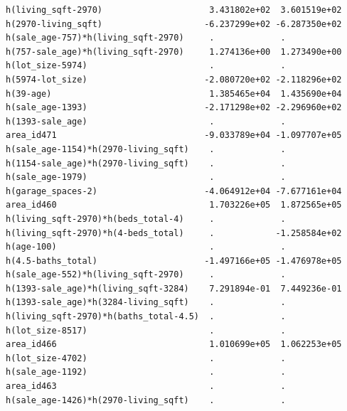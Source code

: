\documentclass[
]{article}
\begin{document}
\begin{verbatim}
h(living_sqft-2970)                     3.431802e+02  3.601519e+02
h(2970-living_sqft)                    -6.237299e+02 -6.287350e+02
h(sale_age-757)*h(living_sqft-2970)     .             .           
h(757-sale_age)*h(living_sqft-2970)     1.274136e+00  1.273490e+00
h(lot_size-5974)                        .             .           
h(5974-lot_size)                       -2.080720e+02 -2.118296e+02
h(39-age)                               1.385465e+04  1.435690e+04
h(sale_age-1393)                       -2.171298e+02 -2.296960e+02
h(1393-sale_age)                        .             .           
area_id471                             -9.033789e+04 -1.097707e+05
h(sale_age-1154)*h(2970-living_sqft)    .             .           
h(1154-sale_age)*h(2970-living_sqft)    .             .           
h(sale_age-1979)                        .             .           
h(garage_spaces-2)                     -4.064912e+04 -7.677161e+04
area_id460                              1.703226e+05  1.872565e+05
h(living_sqft-2970)*h(beds_total-4)     .             .           
h(living_sqft-2970)*h(4-beds_total)     .            -1.258584e+02
h(age-100)                              .             .           
h(4.5-baths_total)                     -1.497166e+05 -1.476978e+05
h(sale_age-552)*h(living_sqft-2970)     .             .           
h(1393-sale_age)*h(living_sqft-3284)    7.291894e-01  7.449236e-01
h(1393-sale_age)*h(3284-living_sqft)    .             .           
h(living_sqft-2970)*h(baths_total-4.5)  .             .           
h(lot_size-8517)                        .             .           
area_id466                              1.010699e+05  1.062253e+05
h(lot_size-4702)                        .             .           
h(sale_age-1192)                        .             .           
area_id463                              .             .           
h(sale_age-1426)*h(2970-living_sqft)    .             .           
                                                                  

\end{verbatim}
\end{document}

